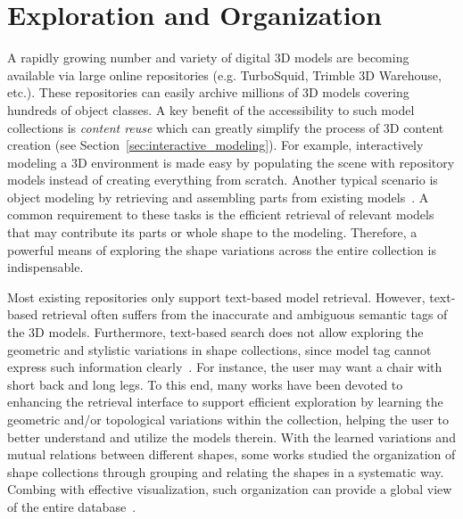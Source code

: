 \section{Exploration and Organization}
\label{sec:exploration}

A rapidly growing number and variety of digital 3D models are becoming available
via large online repositories (e.g. TurboSquid, Trimble 3D Warehouse, etc.).
These repositories can easily archive millions of 3D models covering hundreds of object classes.
%
A key benefit of the accessibility to such model collections is \emph{content reuse} which can greatly simplify the
process of 3D content creation (see Section~\ref{sec:interactive_modeling}). For example, interactively modeling a 3D environment
is made easy by populating the scene with repository models instead of creating everything from scratch.
Another typical scenario is object modeling by retrieving and assembling parts from existing models~\cite{Funkhouser:2004:MBE}.
A common requirement to these tasks is the efficient retrieval of relevant models that may contribute its parts or whole shape
to the modeling. Therefore, a powerful means of exploring the shape variations across the entire collection is indispensable.

Most existing repositories only support text-based model retrieval. However, text-based retrieval often suffers from
the inaccurate and ambiguous semantic tags of the 3D models.
Furthermore, text-based search does not allow exploring the geometric and stylistic variations
in shape collections, since model tag cannot express such information clearly~\cite{Ovsjanikov:2011:ECV,Fisher:2011:CSR}.
For instance, the user may want a chair with short back and long legs.
%
To this end, many works have been devoted to enhancing the retrieval interface to support efficient exploration by learning
the geometric and/or topological variations within the collection, helping the user to better understand and utilize the models therein.
With the learned variations and mutual relations between different shapes,
some works studied the organization of shape collections through grouping and relating the shapes in a systematic way.
Combing with effective visualization, such organization can provide a global view of the entire database~\cite{Huang:2013:QOC}.

